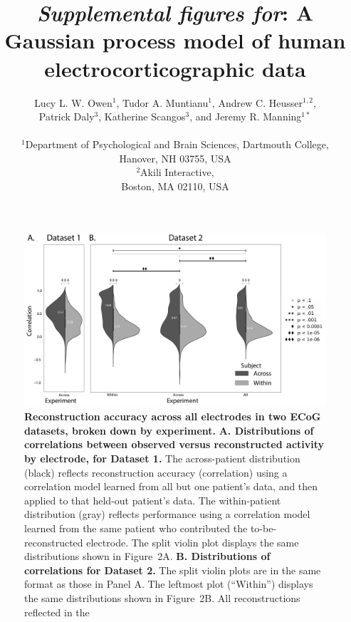 \documentclass[10pt]{article}
\title{\textit{Supplemental figures for}: A Gaussian process model of human electrocorticographic data}
\author{
  Lucy L. W. Owen$^{1}$,
  Tudor A. Muntianu$^{1}$,
  Andrew C. Heusser$^{1, 2}$, \\
  Patrick Daly$^{3}$,
  Katherine Scangos$^{3}$, and
  Jeremy R. Manning$^{1\ast}$\\\\
$^{1}$Department of Psychological and Brain Sciences, Dartmouth College,\\
Hanover, NH 03755, USA\\
$^{2}$Akili Interactive,\\
Boston, MA 02110, USA}
\begin{document}
\setcounter{equation}{0}
\setcounter{figure}{0}
\setcounter{table}{0}
\setcounter{page}{1}
\setcounter{section}{0}
\makeatletter
\renewcommand{\theequation}{S\arabic{equation}}
\renewcommand{\thefigure}{S\arabic{figure}}

\newcommand{\methods}{1}
\newcommand{\corrmaps}{2}
\newcommand{\freqs}{3}
\newcommand{\density}{4}
\newcommand{\infomap}{5}
\newcommand{\infomapfreqs}{6}

\begin{titlepage}
  \maketitle
\end{titlepage}

\begin{figure}[p]
\centering
\includegraphics[width=\textwidth]{figs/supplemental_1}
\caption{\textbf{Reconstruction accuracy across all electrodes in two
    ECoG datasets, broken down by experiment.}
  \textbf{A. Distributions of correlations between observed versus
    reconstructed activity by electrode, for Dataset 1.}  The
  across-patient distribution (black) reflects reconstruction accuracy
  (correlation) using a correlation model learned from all but one
  patient's data, and then applied to that held-out patient's data.
  The within-patient distribution (gray) reflects performance using a
  correlation model learned from the same patient who contributed the
  to-be-reconstructed electrode.  The split violin plot displays the
  same distributions shown in Figure~\corrmaps A.
  \textbf{B. Distributions of correlations for Dataset 2.}  The split
  violin plots are in the same format as those in Panel A.  The
  leftmost plot (``Within'') displays the same distributions shown in
  Figure~\corrmaps B.  All reconstructions reflected in the
}
\end{figure}
\end{document}
